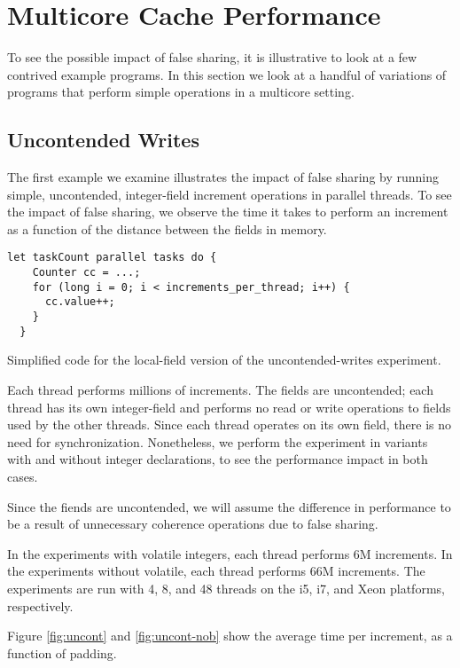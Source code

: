 \section{Multicore Cache Performance}

To see the possible impact of false sharing, it is illustrative to look at a
few contrived example programs. In this section we look at a handful of
variations of programs that perform simple operations in a multicore
setting.

\subsection{Uncontended Writes}
The first example we examine illustrates the impact of false sharing by running
simple, uncontended, integer-field increment operations in parallel threads. To see
the impact of false sharing, we observe the time it takes to perform an
increment as a function of the distance between the fields in memory.

\begin{code}
\begin{Verbatim}[frame=single]
  let taskCount parallel tasks do {
    Counter cc = ...;
    for (long i = 0; i < increments_per_thread; i++) {
      cc.value++;
    }
  }
\end{Verbatim}
	\caption{Simplified code for the local-field version of the uncontended-writes
	experiment.}
\end{code}

Each thread performs millions of increments. The fields are
uncontended; each thread has its own integer-field and performs no read or write
operations to fields used by the other threads. Since each thread operates on
its own field, there is no need for synchronization. Nonetheless, we perform
the experiment in variants with and without  integer declarations, to
see the performance impact in both cases.

Since the fiends are uncontended, we will assume the difference in performance
to be a result of unnecessary coherence operations due to false sharing.

In the experiments with volatile integers, each thread performs 6M increments.
In the experiments without volatile, each thread performs 66M increments. The
experiments are run with 4, 8, and 48 threads on the i5, i7, and Xeon platforms,
respectively.

Figure \ref{fig:uncont} and \ref{fig:uncont-nob} show the average time per
increment, as a function of padding.


